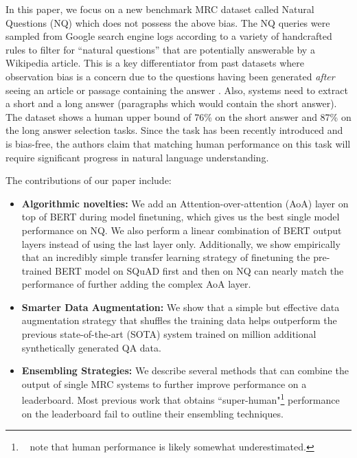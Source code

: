 \documentclass[letterpaper]{article} \usepackage{aaai20}  \usepackage{times}  \usepackage{helvet} \usepackage{courier}  \usepackage[hyphens]{url}  \usepackage{graphicx} \urlstyle{rm} \def\UrlFont{\rm}  \usepackage{graphicx}  \frenchspacing  \setlength{\pdfpagewidth}{8.5in}  \setlength{\pdfpageheight}{11in}  \usepackage{amsmath}
\newcommand{\citet}[1]{\citeauthor{#1}~\shortcite{#1}}
\begin{document}
In this paper, we focus on a new benchmark MRC dataset called Natural Questions (NQ) \cite{Kwiatkowski2019NaturalQA} which does not possess the above bias. The NQ queries were sampled from Google search engine logs according to a variety of handcrafted rules to filter for ``natural questions'' that are potentially answerable by a Wikipedia article.  This is a key differentiator from past datasets where observation bias is a concern due to the questions having been generated \textit{after} seeing an article or passage containing the answer \cite{Kwiatkowski2019NaturalQA}. Also, systems need to extract a short and a long answer (paragraphs which would contain the short answer). The dataset shows a human upper bound of 76\% on the short answer and 87\% on the long answer selection tasks. Since the task has been recently introduced and is bias-free, the authors claim that matching human performance on this task will require significant progress in natural language understanding.

The contributions of our paper include:
\begin{itemize}
    \item \textbf{Algorithmic novelties:} We add an Attention-over-attention (AoA) \cite{cui_2017} layer on top of BERT during model finetuning, which gives us the best single model performance on NQ. We also perform a linear combination of BERT output layers instead of using the last layer only. Additionally, we show empirically that an incredibly simple transfer learning strategy of finetuning the pre-trained BERT model on SQuAD first and then on NQ can nearly match the performance of further adding the complex AoA layer.
\item \textbf{Smarter Data Augmentation:} We show that a simple but effective data augmentation strategy that shuffles the training data helps outperform the previous state-of-the-art (SOTA) system trained on  million additional synthetically generated QA data.
\item \textbf{Ensembling Strategies:} We describe several methods that can combine the output of single MRC systems to further improve performance on a leaderboard. Most previous work that obtains ``super-human"\footnote{\citet{rajpurkar2018know} note that human performance is likely somewhat underestimated.} performance on the leaderboard fail to outline their ensembling techniques.
\end{itemize}
\end{document}
